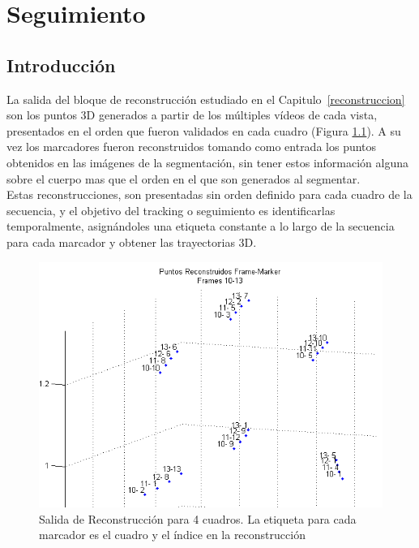 \chapter{Seguimiento}
\label{seguimiento}
\section{Introducción}

La salida del bloque de reconstrucción estudiado en el Capitulo~\ref{reconstruccion} son los puntos 3D generados a partir de los múltiples vídeos de cada vista, presentados en el orden que fueron validados en cada cuadro (Figura \ref{reconstr_00}). A su vez los marcadores fueron reconstruidos tomando como entrada los puntos obtenidos en las imágenes de la segmentación, sin tener estos información alguna sobre el cuerpo mas que el orden en el que son generados al segmentar.
\\ 

Estas reconstrucciones, son presentadas sin orden definido para cada cuadro de la secuencia, y el objetivo del tracking o seguimiento es identificarlas temporalmente, asignándoles una etiqueta constante a lo largo de la secuencia para cada marcador y obtener las trayectorias 3D.

\begin{figure}[H]
\begin{center}
\includegraphics[scale=0.6]{img/Tracking/00_Salida_Reconstruccion.png}
\end{center}
\caption{Salida de Reconstrucción para 4 cuadros. La etiqueta para cada marcador es el cuadro y el índice en la reconstrucción}
\label{reconstr_00}
\end{figure}

